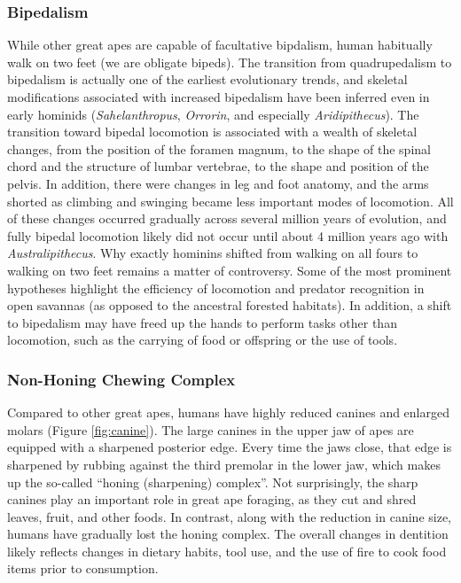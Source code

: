 \documentclass[
]{book}
\begin{document}
\hypertarget{bipedalism}{%
\subsubsection*{Bipedalism}\label{bipedalism}}

While other great apes are capable of facultative bipdalism, human habitually walk on two feet (we are obligate bipeds). The transition from quadrupedalism to bipedalism is actually one of the earliest evolutionary trends, and skeletal modifications associated with increased bipedalism have been inferred even in early hominids (\emph{Sahelanthropus}, \emph{Orrorin}, and especially \emph{Aridipithecus}). The transition toward bipedal locomotion is associated with a wealth of skeletal changes, from the position of the foramen magnum, to the shape of the spinal chord and the structure of lumbar vertebrae, to the shape and position of the pelvis. In addition, there were changes in leg and foot anatomy, and the arms shorted as climbing and swinging became less important modes of locomotion. All of these changes occurred gradually across several million years of evolution, and fully bipedal locomotion likely did not occur until about 4 million years ago with \emph{Australipithecus}. Why exactly hominins shifted from walking on all fours to walking on two feet remains a matter of controversy. Some of the most prominent hypotheses highlight the efficiency of locomotion and predator recognition in open savannas (as opposed to the ancestral forested habitats). In addition, a shift to bipedalism may have freed up the hands to perform tasks other than locomotion, such as the carrying of food or offspring or the use of tools.

\hypertarget{non-honing-chewing-complex}{%
\subsubsection*{Non-Honing Chewing Complex}\label{non-honing-chewing-complex}}

Compared to other great apes, humans have highly reduced canines and enlarged molars (Figure \ref{fig:canine}). The large canines in the upper jaw of apes are equipped with a sharpened posterior edge. Every time the jaws close, that edge is sharpened by rubbing against the third premolar in the lower jaw, which makes up the so-called ``honing (sharpening) complex''. Not surprisingly, the sharp canines play an important role in great ape foraging, as they cut and shred leaves, fruit, and other foods. In contrast, along with the reduction in canine size, humans have gradually lost the honing complex. The overall changes in dentition likely reflects changes in dietary habits, tool use, and the use of fire to cook food items prior to consumption.
\end{document}
